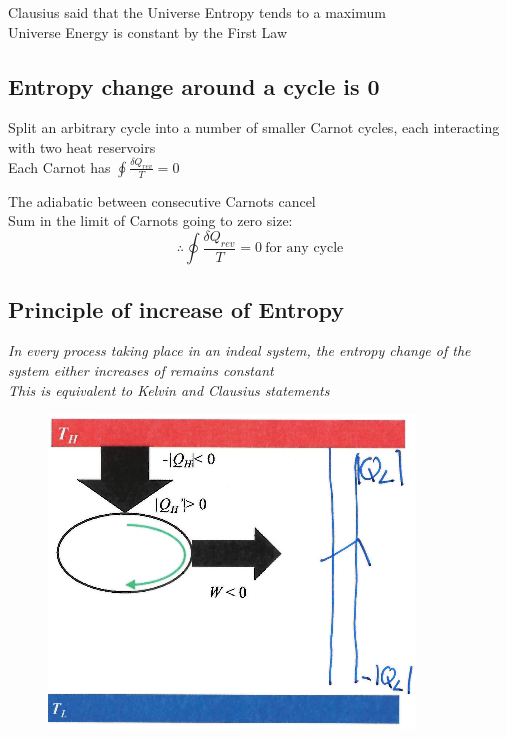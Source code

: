 \documentclass[a4paper, 11pt, normalem]{report}
\begin{document}
Clausius said that the Universe Entropy tends to a maximum \\
Universe Energy is constant by the First Law

\subsection{Entropy change around a cycle is 0}
Split an arbitrary cycle into a number of smaller Carnot cycles, each interacting with two heat reservoirs \\
Each Carnot has $\oint \frac{\delta Q_{rev}}{T} = 0$

The adiabatic between consecutive Carnots cancel \\
Sum in the limit of Carnots going to zero size:
\begin{equation*}
    \therefore \oint \frac{\delta Q_{rev}}{T} = 0 ~ \text{for any cycle}
\end{equation*}

\subsection{Principle of increase of Entropy}
\emph{In every process taking place in an indeal system, the entropy change of the system either increases of remains constant \\
This is equivalent to Kelvin and Clausius statements}

\begin{figure}
    \begin{center}
        \includegraphics[scale=0.5]{EquivEntropy.png}
    \end{center}
\end{figure}
\end{document}
